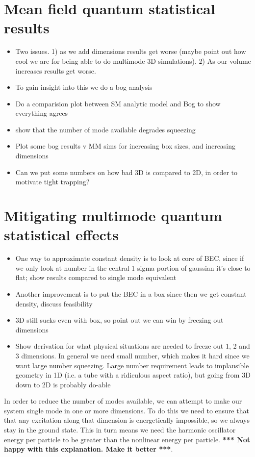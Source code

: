 \documentclass[12pt]{iopart}
\begin{document}
\section{Mean field quantum statistical results}
  \begin{itemize}
  \item Two issues. 1) as we add dimensions results get worse (maybe point out how cool we are for being able to do multimode 3D simulations). 2) As our volume increases results get worse.
  \item To gain insight into this we do a bog analysis
  \item Do a comparision plot between SM analytic model and Bog to show everything agrees
  \item show that the number of mode available degrades squeezing
  \item Plot some bog results v MM sims for increasing box sizes, and increasing dimensions
  \item Can we put some numbers on how bad 3D is compared to 2D, in order to motivate tight trapping?
  \end{itemize}

\section{Mitigating multimode quantum statistical effects}
  \begin{itemize}
  \item One way to approximate constant density is to look at core of BEC, since if we only look at number in the central 1 sigma portion of gaussian it's close to flat; show results compared to single mode equivalent

  \item Another improvement is to put the BEC in a box since then we get constant density, discuss feasibility
  \item 3D still sucks even with box, so point out we can win by freezing out dimensions
  \item Show derivation for what physical situations are needed to freeze out 1, 2 and 3 dimensions. In general we need small number, which makes it hard since we want large number squeezing. Large number requirement leads to implausible geometry in 1D (i.e. a tube with a ridiculous aspect ratio), but going from 3D down to 2D is probably do-able
  \end{itemize}

In order to reduce the number of modes available, we can attempt to make our system single mode in one or more dimensions. To do this we need to ensure that that any excitation along that dimension is energetically impossible, so we always stay in the ground state. This in turn means we need the harmonic oscillator energy per particle to be greater than the nonlinear energy per particle. {\bf{*** Not happy with this explanation. Make it better ***}}.
\end{document}
